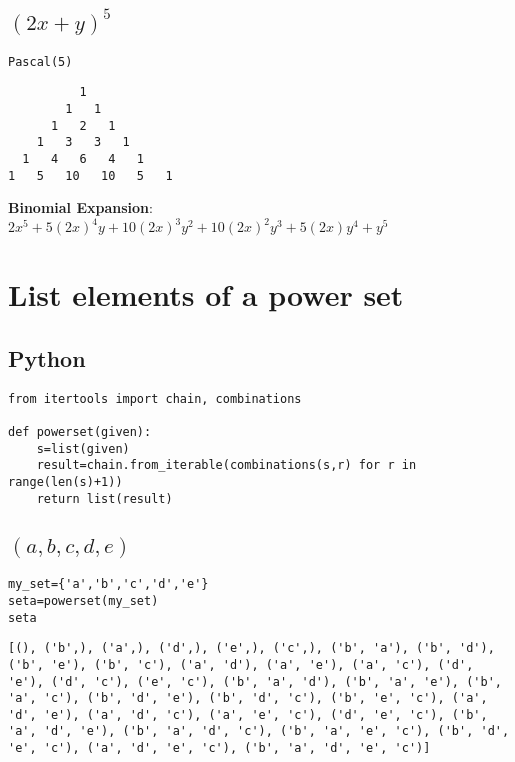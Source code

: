 \documentclass[11pt]{article}
\begin{document}
\subsection{\((2x+y)^5\)}
\label{sec:orga8ec93b}
\begin{verbatim}
Pascal(5)
\end{verbatim}

\begin{verbatim}
          1   
        1   1   
      1   2   1   
    1   3   3   1   
  1   4   6   4   1   
1   5   10   10   5   1   
\end{verbatim}


\textbf{Binomial Expansion}:
\(2x^{5}+5(2x)^{4}y+10(2x)^{3}y^{2}+10(2x)^{2}y^{3}+5(2x)y^{4}+y^{5}\)

\section{List elements of a power set}
\label{sec:orgf011d74}

\subsection{Python}
\label{sec:org9f69656}
\begin{verbatim}
from itertools import chain, combinations

def powerset(given):
    s=list(given)
    result=chain.from_iterable(combinations(s,r) for r in range(len(s)+1))
    return list(result)

\end{verbatim}

\subsection{\((a,b,c,d,e)\)}
\label{sec:org419acb5}
\begin{verbatim}
my_set={'a','b','c','d','e'}
seta=powerset(my_set)
seta
\end{verbatim}

\begin{verbatim}
[(), ('b',), ('a',), ('d',), ('e',), ('c',), ('b', 'a'), ('b', 'd'), ('b', 'e'), ('b', 'c'), ('a', 'd'), ('a', 'e'), ('a', 'c'), ('d', 'e'), ('d', 'c'), ('e', 'c'), ('b', 'a', 'd'), ('b', 'a', 'e'), ('b', 'a', 'c'), ('b', 'd', 'e'), ('b', 'd', 'c'), ('b', 'e', 'c'), ('a', 'd', 'e'), ('a', 'd', 'c'), ('a', 'e', 'c'), ('d', 'e', 'c'), ('b', 'a', 'd', 'e'), ('b', 'a', 'd', 'c'), ('b', 'a', 'e', 'c'), ('b', 'd', 'e', 'c'), ('a', 'd', 'e', 'c'), ('b', 'a', 'd', 'e', 'c')]
\end{verbatim}
\end{document}
